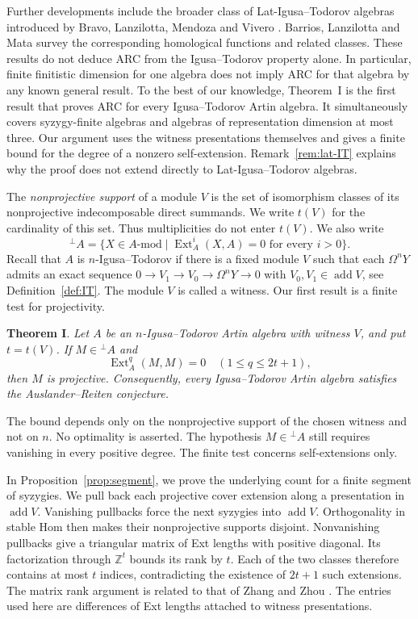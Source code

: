 \documentclass[a4paper,reqno]{amsart}
\numberwithin{equation}{section}
\theoremstyle{definition}
\DeclareMathOperator{\Ext}{Ext}
\DeclareMathOperator{\add}{add}
\newcommand{\modA}{A\text{-}\mathrm{mod}}
\newcommand{\perpA}{{}^{\perp}A}
\begin{document}
Further developments include the broader class of Lat-Igusa--Todorov algebras introduced by Bravo, Lanzilotta, Mendoza and Vivero \cite{BLMV2021}. Barrios, Lanzilotta and Mata \cite{BLM2024} survey the corresponding homological functions and related classes. These results do not deduce ARC from the Igusa--Todorov property alone. In particular, finite finitistic dimension for one algebra does not imply ARC for that algebra by any known general result. To the best of our knowledge, Theorem~I is the first result that proves ARC for every Igusa--Todorov Artin algebra. It simultaneously covers syzygy-finite algebras and algebras of representation dimension at most three. Our argument uses the witness presentations themselves and gives a finite bound for the degree of a nonzero self-extension. Remark~\ref{rem:lat-IT} explains why the proof does not extend directly to Lat-Igusa--Todorov algebras.

The \emph{nonprojective support} of a module $V$ is the set of isomorphism classes of its nonprojective indecomposable direct summands. We write $t(V)$ for the cardinality of this set. Thus multiplicities do not enter $t(V)$. We also write
\[
\perpA=\{X\in\modA\mid\Ext_A^i(X,A)=0\text{ for every }i>0\}.
\]
Recall that $A$ is $n$-Igusa--Todorov if there is a fixed module $V$ such that each $\Omega^nY$ admits an exact sequence $0\to V_1\to V_0\to\Omega^nY\to0$ with $V_0,V_1\in\add V$, see Definition~\ref{def:IT}. The module $V$ is called a witness. Our first result is a finite test for projectivity. 

\vskip 5pt
\noindent\textbf{Theorem I}. \emph{Let $A$ be an $n$-Igusa--Todorov Artin algebra with witness $V$, and put $t=t(V)$. If $M\in\perpA$ and}
\[
\Ext_A^q(M,M)=0\quad(1\leq q\leq2t+1),
\]
\emph{then $M$ is projective. Consequently, every Igusa--Todorov Artin algebra satisfies the Auslander--Reiten conjecture.}
\vskip 5pt

The bound depends only on the nonprojective support of the chosen witness and not on $n$. No optimality is asserted. The hypothesis $M\in\perpA$ still requires vanishing in every positive degree. The finite test concerns self-extensions only.

In Proposition~\ref{prop:segment}, we prove the underlying count for a finite segment of syzygies. We pull back each projective cover extension along a presentation in $\add V$. Vanishing pullbacks force the next syzygies into $\add V$. Orthogonality in stable Hom then makes their nonprojective supports disjoint. Nonvanishing pullbacks give a triangular matrix of Ext lengths with positive diagonal. Its factorization through $\mathbb Z^t$ bounds its rank by $t$. Each of the two classes therefore contains at most $t$ indices, contradicting the existence of $2t+1$ such extensions. The matrix rank argument is related to that of Zhang and Zhou \cite[Lemma~3.8]{ZZ2026}. The entries used here are differences of Ext lengths attached to witness presentations.
\end{document}

